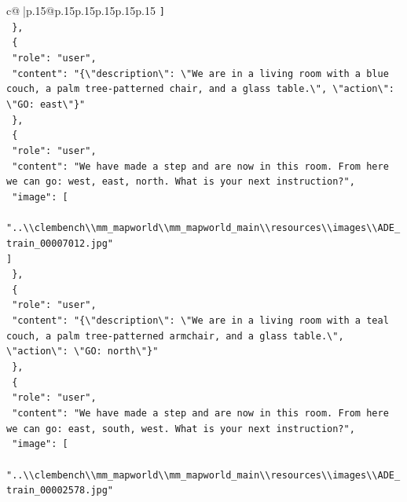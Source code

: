\documentclass{article}
\begin{document}
{\begin{supertabular}{c@{$\;$}|p{.15\linewidth}@{}p{.15\linewidth}p{.15\linewidth}p{.15\linewidth}p{.15\linewidth}p{.15\linewidth}}
{{{\texttt{    {]}} \\
\texttt{  \},} \\
\texttt{  \{} \\
\texttt{    "role": "user",} \\
\texttt{    "content": "\{\textbackslash{}"description\textbackslash{}": \textbackslash{}"We are in a living room with a blue couch, a palm tree{-}patterned chair, and a glass table.\textbackslash{}", \textbackslash{}"action\textbackslash{}": \textbackslash{}"GO: east\textbackslash{}"\}"} \\
\texttt{  \},} \\
\texttt{  \{} \\
\texttt{    "role": "user",} \\
\texttt{    "content": "We have made a step and are now in this room. From here we can go: west, east, north. What is your next instruction?",} \\
\texttt{    "image": {[}} \\
\texttt{      "..\textbackslash{}\textbackslash{}clembench\textbackslash{}\textbackslash{}mm\_mapworld\textbackslash{}\textbackslash{}mm\_mapworld\_main\textbackslash{}\textbackslash{}resources\textbackslash{}\textbackslash{}images\textbackslash{}\textbackslash{}ADE\_train\_00007012.jpg"} \\
\texttt{    {]}} \\
\texttt{  \},} \\
\texttt{  \{} \\
\texttt{    "role": "user",} \\
\texttt{    "content": "\{\textbackslash{}"description\textbackslash{}": \textbackslash{}"We are in a living room with a teal couch, a palm tree{-}patterned armchair, and a glass table.\textbackslash{}", \textbackslash{}"action\textbackslash{}": \textbackslash{}"GO: north\textbackslash{}"\}"} \\
\texttt{  \},} \\
\texttt{  \{} \\
\texttt{    "role": "user",} \\
\texttt{    "content": "We have made a step and are now in this room. From here we can go: east, south, west. What is your next instruction?",} \\
\texttt{    "image": {[}} \\
\texttt{      "..\textbackslash{}\textbackslash{}clembench\textbackslash{}\textbackslash{}mm\_mapworld\textbackslash{}\textbackslash{}mm\_mapworld\_main\textbackslash{}\textbackslash{}resources\textbackslash{}\textbackslash{}images\textbackslash{}\textbackslash{}ADE\_train\_00002578.jpg"} \\
}}}
\end{supertabular}}
\end{document}
